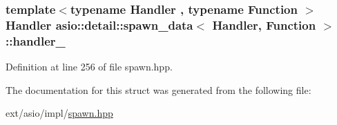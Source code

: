 \subsubsection[{handler\+\_\+}]{\setlength{\rightskip}{0pt plus 5cm}template$<$typename Handler , typename Function $>$ Handler {\bf asio\+::detail\+::spawn\+\_\+data}$<$ Handler, Function $>$\+::handler\+\_\+}\label{structasio_1_1detail_1_1spawn__data_a9450f8cd517de26ccb775cdd8f0254e9}


Definition at line 256 of file spawn.\+hpp.



The documentation for this struct was generated from the following file\+:\begin{DoxyCompactItemize}
\item 
ext/asio/impl/\hyperlink{impl_2spawn_8hpp}{spawn.\+hpp}\end{DoxyCompactItemize}
